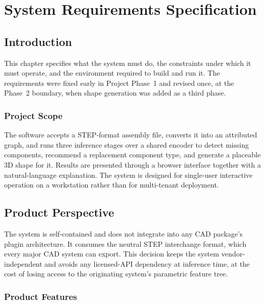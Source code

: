 \documentclass[12pt,oneside,a4paper]{report}
\begin{document}
\chapter{System Requirements Specification}

\section{Introduction}

This chapter specifies what the system must do, the constraints under which
it must operate, and the environment required to build and run it. The
requirements were fixed early in Project Phase~1 and revised once, at the
Phase~2 boundary, when shape generation was added as a third phase.

\subsection{Project Scope}

The software accepts a STEP-format assembly file, converts it into an
attributed graph, and runs three inference stages over a shared encoder to
detect missing components, recommend a replacement component type, and
generate a placeable 3D shape for it. Results are presented through a browser
interface together with a natural-language explanation. The system is
designed for single-user interactive operation on a workstation rather than
for multi-tenant deployment.

\section{Product Perspective}

The system is self-contained and does not integrate into any CAD package's
plugin architecture. It consumes the neutral STEP interchange format, which
every major CAD system can export. This decision keeps the system
vendor-independent and avoids any licensed-API dependency at inference time,
at the cost of losing access to the originating system's parametric feature
tree.

\subsection{Product Features}
\end{document}
